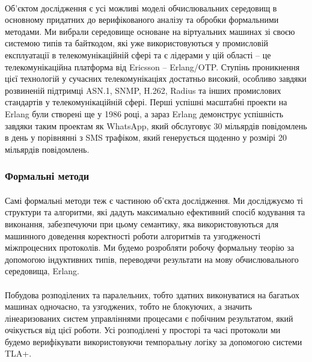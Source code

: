 \documentclass[11pt,oneside]{article}
\begin{document}
   \paragraph{}
   Об’єктом дослідження є усі можливі моделі обчислювальних середовищ в основному придатних
   до верифікованого аналізу та обробки формальними методами. Ми вибрали середовище
   основане на віртуальних машинах зі своєю системою типів та байткодом, які уже
   використовуються у промисловій експлуатації в телекомунікаційній сфері та є лідерами
   у цій області -- це телекомунікаційна платформа від Ericsson -- Erlang/OTP. Ступінь проникнення
   цієї технологій у сучасних телекомунікаціях достатньо високий, особливо завдяки
   розвиненій підтримці ASN.1, SNMP, H.262, Radius та інших промислових стандартів
   у телекомунікаційній сфері. Перші успішні масштабні проекти на Erlang були створені ще у
   1986 році, а зараз Erlang демонструє успішність завдяки таким проектам як WhatsApp, який
   обслуговує 30 мільярдів повідомлень в день у порівнянні з SMS трафіком,
   який генерується щоденно у розмірі 20 мільярдів повідомлень.

\newpage

\subsubsection{Формальні методи}
\vspace{0.5cm}

   \paragraph{}
   Самі формальні методи теж є частиною об’єкта дослідження. Ми досліджуємо ті структури
   та алгоритми, які дадуть максимально ефективний спосіб кодування та виконання,
   забезпечуючи при цьому семантику, яка використовуються для машинного доведення
   коректності роботи алгоритмів та узгодженості міжпроцесних протоколів.
   Ми будемо розробляти робочу формальну теорію за допомогою індуктивних типів,
   переводячи результати на мову обчислювального середовища, Erlang.

   \paragraph{}
   Побудова розподілених та паралельних, тобто здатних виконуватися на багатьох машинах одночасно, та
   узгоджених, тобто не блокуючих, а значить лінеаризованих систем управліннями процесами є побічним
   результатом, який очікується від цієї роботи. Усі розподілені у просторі та часі
   протоколи ми будемо верифікувати використовуючи темпоральну логіку за допомогою системи TLA+.
\end{document}
